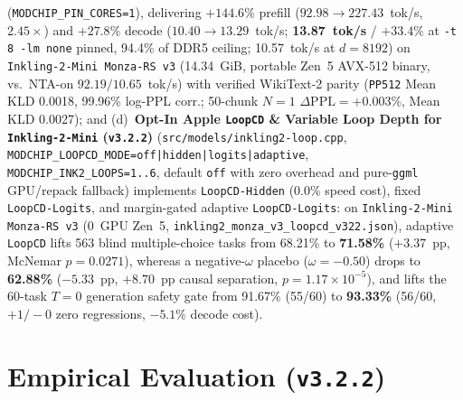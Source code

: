 \documentclass[10pt,twocolumn]{article}
\begin{document}
\begin{enumerate}
(\texttt{MODCHIP\_PIN\_CORES=1}), delivering \textbf{$+144.6\%$} prefill ($92.98 \to 227.43$~tok/s, $2.45\times$) and \textbf{$+27.8\%$} decode ($10.40 \to 13.29$~tok/s; \textbf{13.87~tok/s} / $+33.4\%$ at \texttt{-t 8 -lm none} pinned, 94.4\% of DDR5 ceiling; 10.57~tok/s at $d{=}8192$) on \texttt{Inkling-2-Mini Monza-RS v3} (14.34~GiB, portable Zen~5 AVX-512 binary, vs.\ NTA-on $92.19/10.65$~tok/s) with verified WikiText-2 parity (\texttt{PP512} Mean KLD 0.0018, 99.96\% log-PPL corr.; 50-chunk $N{=}1$ $\Delta\text{PPL}=+0.003\%$, Mean KLD 0.0027); and (d)~\textbf{Opt-In Apple \texttt{LoopCD} \& Variable Loop Depth for \texttt{Inkling-2-Mini} (\texttt{v3.2.2})} \cite{loopcd2026} (\texttt{src/models/inkling2-loop.cpp}, \texttt{MODCHIP\_LOOPCD\_MODE=off|hidden|logits|adaptive}, \texttt{MODCHIP\_INK2\_LOOPS=1..6}, default \texttt{off} with zero overhead and pure-\texttt{ggml} GPU/repack fallback) implements \texttt{LoopCD-Hidden} ($0.0\%$ speed cost), fixed \texttt{LoopCD-Logits}, and margin-gated adaptive \texttt{LoopCD-Logits}: on \texttt{Inkling-2-Mini Monza-RS v3} (0~GPU Zen~5, \texttt{inkling2\_monza\_v3\_loopcd\_v322.json}), adaptive \texttt{LoopCD} lifts 563 blind multiple-choice tasks from 68.21\% to \textbf{71.58\%} ($+3.37$~pp, McNemar $p{=}0.0271$), whereas a negative-$\omega$ placebo ($\omega{=}-0.50$) drops to \textbf{62.88\%} ($-5.33$~pp, $+8.70$~pp causal separation, $p{=}1.17\times 10^{-5}$), and lifts the 60-task $T{=}0$ generation safety gate from 91.67\% (55/60) to \textbf{93.33\%} (56/60, $+1/-0$ zero regressions, $-5.1\%$ decode cost).
\end{enumerate}

\section{Empirical Evaluation (\texttt{v3.2.2})}
\label{sec:eval}
\end{document}
